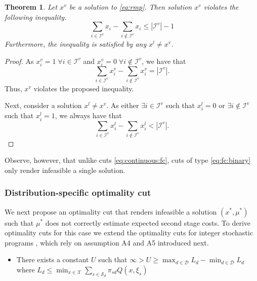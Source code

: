 \documentclass[12pt]{article}
\newtheorem{theorem}{Theorem}%
\theoremstyle{thmstylethree}%
\newcommand{\mtc}[1] {\mathcal{#1}}
\begin{document}
\begin{theorem}\label{prop:fc:binary}
Let $x^v$ be a solution to \eqref{eq:rmp}.
Then solution $x^v$ violates the following inequality.
\begin{equation}
\label{eq:fc:binary}
    \sum_{i\in\mtc{I}^v}x_i-\sum_{i\notin\mtc{I}^v}x_i\leq |\mtc{I}^v|-1
\end{equation}
Furthermore, the inequality is satisfied by any $x^l\neq x^v$.
\end{theorem}
\begin{proof}
As $x_i^v = 1 \;\forall i \in \mtc{I}^v$ and $x_i^v = 0 \;\forall i \not\in \mtc{I}^v$, we have that
$$\sum_{i\in\mtc{I}^v}x_i^v-\sum_{i\notin\mtc{I}^v}x_i^v= |\mtc{I}^v|.$$ Thus, $x^v$ violates the proposed inequality.

Next, consider a solution $x^l \neq x^v$. As either $\exists i \in \mtc{I}^v$ such that $x_i^l = 0$ or $\exists i \not\in \mtc{I}^v$ such that $x_i^l = 1$, we always have that
$$\sum_{i\in\mtc{I}^v}x_i^l-\sum_{i\notin\mtc{I}^v}x_i^l<|\mtc{I}^v|.$$ 
\end{proof}

Observe, however, that unlike cuts \eqref{eq:continuous:fc}, cuts of type \eqref{eq:fc:binary} only render infeasible a single solution. 

\subsubsection{Distribution-specific optimality cut}
\label{subsubsec:mip_sp:opt_cut}
We next propose an optimality cut that renders infeasible a solution $(x^*,\mu^*)$ such that $\mu^*$ does not correctly estimate expected second stage costs.
To derive optimality cuts for this case we extend the optimality cuts for integer stochastic programs \cite{LapL93}, which rely on assumption A4 and A5 introduced next. 
 
 \begin{itemize}
     \item[\textbf{A5}] There exists a constant $U$ such that $\infty>U\geq \max_{d\in\mtc{D}}L_d-\min_{d\in\mtc{D}}L_d$ where $L_d\leq \min_{x\in\mtc{X}}\sum_{s\in\mtc{S}_{d}}\pi_{sd}Q(x,\xi_s)$

 \end{itemize}
   
\end{document}
